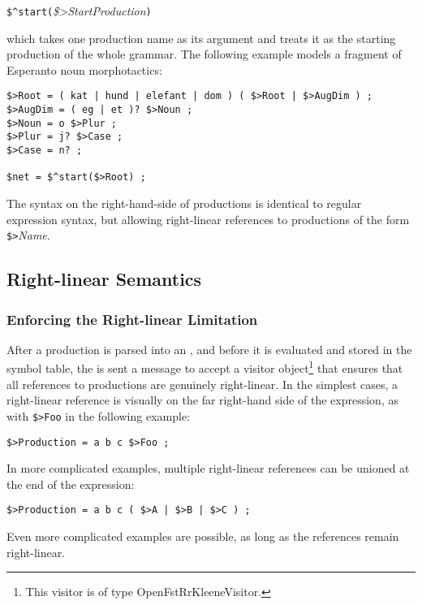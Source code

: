 \vspace{0.5cm}
\verb!$^start(!\emph{\$>StartProduction}\verb!)!
\vspace{0.5cm}

\noindent
which takes one production
name as its argument and treats it as the starting production of the whole
grammar.  The following example models a fragment of Esperanto noun morphotactics:

\begin{Verbatim}
$>Root = ( kat | hund | elefant | dom ) ( $>Root | $>AugDim ) ;
$>AugDim = ( eg | et )? $>Noun ;
$>Noun = o $>Plur ;
$>Plur = j? $>Case ;
$>Case = n? ;

$net = $^start($>Root) ;
\end{Verbatim}

\noindent
The syntax on the right-hand-side of productions is identical to regular
expression syntax, but allowing right-linear references to productions of the form
\verb!$>!\emph{Name}.

\subsection{Right-linear Semantics}


\subsubsection{Enforcing the Right-linear Limitation}

After a production is parsed into an
, and before it is evaluated and stored in the symbol table, the
 is sent a message to accept a visitor object\footnote{This
visitor is of type
OpenFstRrKleeneVisitor.} that ensures that
all references to productions are genuinely right-linear.  In the simplest cases,
a right-linear reference is visually on the far right-hand side of the
expression, as with \verb!$>Foo! in the following example:

\begin{Verbatim}
$>Production = a b c $>Foo ;
\end{Verbatim}

\noindent
In more complicated examples, multiple right-linear references can be unioned 
at the end of the expression:

\begin{Verbatim}
$>Production = a b c ( $>A | $>B | $>C ) ;
\end{Verbatim}

\noindent
Even more complicated examples are possible, as long as the references remain
right-linear. 

